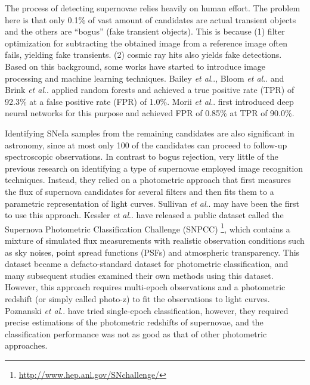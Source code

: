 \documentclass[conference,compsoc]{IEEEtran}
\makeatletter
\DeclareRobustCommand\onedot{\futurelet\@let@token\@onedot}
\def\@onedot{\ifx\@let@token.\else.\null\fi\xspace}
\def\etal{\emph{et al}\onedot}
\makeatother
\begin{document}
  The process of detecting supernovae relies heavily on human effort.
  The problem here is that only 0.1\% of vast amount of candidates are actual transient objects and the others are ``bogus'' (fake transient objects).
  This is because
  (1) filter optimization for subtracting the obtained image from a reference image often fails, yielding fake transients.
  (2) cosmic ray hits also yields fake detections.
  Based on this background, some works have started to introduce image processing and machine learning techniques.
  Bailey \etal \cite{Bailey2007}, Bloom \etal \cite{Bloom2012} and Brink \etal \cite{Brink2013} applied random forests and achieved a true positive rate (TPR) of 92.3\% at a false positive rate (FPR) of 1.0\%.
  Morii \etal \cite{Morii2016} first introduced deep neural networks for this purpose and achieved FPR of 0.85\% at TPR of 90.0\%.

  Identifying SNeIa samples from the remaining candidates are also significant in astronomy, since at most only 100 of the candidates can proceed to follow-up spectroscopic observations.
  In contrast to bogus rejection, very little of the previous research on identifying a type of supernovae employed image recognition techniques.
  Instead, they relied on a photometric approach that first measures the flux of supernova candidates for several filters and then fits them to a parametric representation of light curves.
  Sullivan \etal \cite{Sullivan2006} may have been the first to use this approach. %
  Kessler \etal \cite{Kessler2010a} have released a public dataset called the Supernova Photometric Classification Challenge (SNPCC) \footnote{\url{http://www.hep.anl.gov/SNchallenge/}}, which contains a mixture of simulated flux measurements with realistic observation conditions such as sky noises, point spread functions (PSFs) and atmospheric transparency.
  This dataset became a defacto-standard dataset for photometric classification, and many subsequent studies \cite{Richards2012,Karpenka2013,Lochner2016,Charnock2016} examined their own methods using this dataset.
  However, this approach requires multi-epoch observations and a photometric redshift (or simply called photo-z) to fit the observations to light curves.
  Poznanski \etal \cite{Poznanski2007} have tried single-epoch classification, however, they required precise estimations of the photometric redshifts of supernovae, and the classification performance was not as good as that of other photometric approaches.
\end{document}
